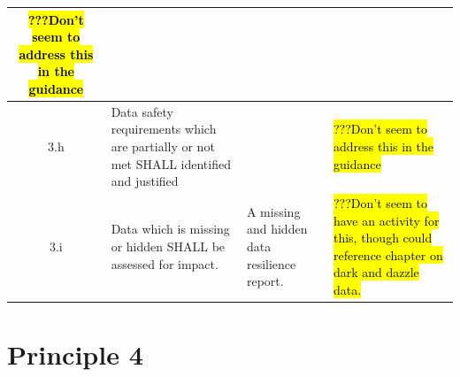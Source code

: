 {\begin{longtable}{|C{}|L{}|L{}|L{}|}
	  \hl{???Don't seem to address this in the guidance}%
	  \\\hline
	3.h &%
	  Data safety requirements which are partially or not met SHALL identified and justified &%
	  &%
	  \hl{???Don't seem to address this in the guidance}%
	  \\\hline
	3.i &%
	  Data which is missing or hidden SHALL be assessed for impact. &%
	  A missing and hidden data resilience report.&%
	  \hl{???Don't seem to have an activity for this, though could reference chapter on dark and dazzle data.} %
	  \\\hline
\end{longtable}
\cbend

\section{Principle 4}

}

